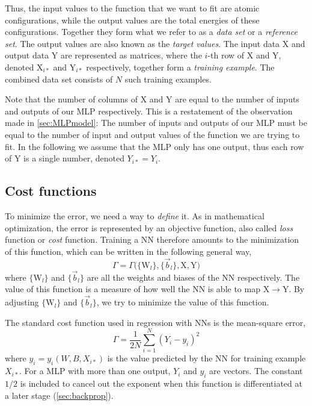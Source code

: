 \documentclass[twoside,english]{uiofysmaster}
\begin{document}
Thus, the input values to the function that we want to fit are atomic configurations,
while the output values are the total energies of these configurations. 
Together they form what we refer to as a \textit{data set} or a \textit{reference set}. 
The output values are also known as the \textit{target values}. 
The input data $\mathrm{X}$ and output data $\mathrm{Y}$ are represented as matrices, where the $i$-th row of X and Y, 
denoted $\mathrm{X}_{i*}$ and $\mathrm{Y}_{i*}$ respectively, 
together form a \textit{training example}. The combined data set consists of $N$ such training examples. 

Note that the number of columns of X and Y are equal to the number of inputs and outputs of our MLP respectively. 
This is a restatement of the observation made in \autoref{sec:MLPmodel}: The number of inputs and outputs of our MLP must be equal 
to the number of input and output values of the function we are trying to fit. In the following we assume that the MLP only has one 
output, thus each row of Y is a single number, denoted $Y_{i*} = Y_i$. 


\subsection{Cost functions} \label{costFunctions}
To minimize the error, we need a way to \textit{define} it. 
As in mathematical optimization, the error is represented by an objective function, also called \textit{loss} function
or \textit{cost} function. Training a NN therefore amounts to the minimization of this function, which can be written in the 
following general way,
\begin{equation}
 \Gamma = \Gamma\bigr(\{\mathrm{W}_l\}, \{\vec{b}_l\}, \mathrm{X}, \mathrm{Y}\bigr)
 \label{generalCost}
\end{equation}
where $\{\mathrm{W}_l\}$ and $\{\vec{b}_l\}$ are all the weights and biases of the NN respectively. 
The value of this function is a measure of how well the NN is able to map $\mathrm{X} \rightarrow \mathrm{Y}$. 
By adjusting $\{\mathrm{W}_l\}$ and $\{\vec{b}_l\}$, we try to minimize the value of this function.  

The standard cost function used in regression with NNs is the mean-square error,
\begin{equation}
 \Gamma = \frac{1}{2N}\sum_{i=1}^N (Y_i - y_i)^2
 \label{quadraticCost}
\end{equation}
where $y_i = y_i(W, B, X_{i*})$ is the value predicted by the NN for training example $X_{i*}$. 
For a MLP with more than one output, $Y_i$ and $y_i$ are vectors. 
The constant $1/2$ is included to cancel out the exponent when this function is differentiated at a later stage
(\autoref{sec:backprop}).
\end{document}
